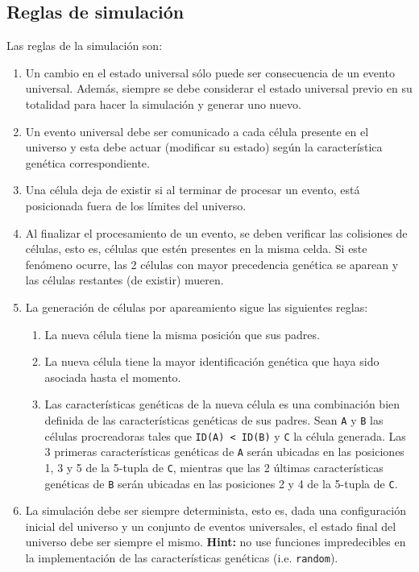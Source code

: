 \documentclass[letterpaper,10pt]{article}
\begin{document}
\subsection{Reglas de simulación}
Las reglas de la simulación son:

\begin{enumerate}
	\item Un cambio en el estado universal sólo puede ser consecuencia de un evento universal. Además, siempre se debe considerar el estado universal previo en su totalidad para hacer la simulación y generar uno nuevo.

	\item Un evento universal debe ser comunicado a cada célula presente en el universo y esta debe actuar (modificar su estado) según la característica genética correspondiente.

	\item Una célula deja de existir si al terminar de procesar un evento, está posicionada fuera de los límites del universo.

	\item Al finalizar el procesamiento de un evento, se deben verificar las colisiones de células, esto es, células que estén presentes en la misma celda. Si este fenómeno ocurre, las 2 células con mayor precedencia genética se aparean y las células restantes (de existir) mueren.
	
	\item La generación de células por apareamiento sigue las siguientes reglas:
	
	\begin{enumerate}
	\item La nueva célula tiene la misma posición que sus padres.

	\item La nueva célula tiene la mayor identificación genética que haya sido asociada hasta el momento.

	\item Las características genéticas de la nueva célula es una combinación bien definida de las características genéticas de sus padres. Sean \texttt{A} y \texttt{B} las células procreadoras tales que \texttt{ID(A) < ID(B)} y \texttt{C} la célula generada. Las 3 primeras características genéticas de \texttt{A} serán ubicadas en las posiciones 1, 3 y 5 de la 5-tupla de \texttt{C}, mientras que las 2 últimas características genéticas de \texttt{B} serán ubicadas en las posiciones 2 y 4 de la 5-tupla de \texttt{C}.
	\end{enumerate}
	
	\item La simulación debe ser siempre determinista, esto es, dada una configuración inicial del universo y un conjunto de eventos universales, el estado final del universo debe ser siempre el mismo. \textbf{Hint:} no use funciones impredecibles en la implementación de las características genéticas (i.e. \texttt{random}).
	
	
\end{enumerate}
\end{document}
